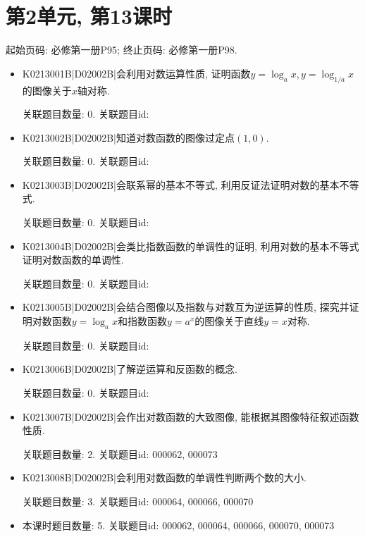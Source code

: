\section*{第2单元, 第13课时}
起始页码: 必修第一册P95; 终止页码: 必修第一册P98.
\begin{itemize}
\item K0213001B|D02002B|会利用对数运算性质, 证明函数$y=\log_ax,y=\log_{1/a}x$的图像关于$x$轴对称.

关联题目数量: 0. 关联题目id: 

\item K0213002B|D02002B|知道对数函数的图像过定点$(1,0)$.

关联题目数量: 0. 关联题目id: 

\item K0213003B|D02002B|会联系幂的基本不等式, 利用反证法证明对数的基本不等式.

关联题目数量: 0. 关联题目id: 

\item K0213004B|D02002B|会类比指数函数的单调性的证明, 利用对数的基本不等式证明对数函数的单调性.

关联题目数量: 0. 关联题目id: 

\item K0213005B|D02002B|会结合图像以及指数与对数互为逆运算的性质, 探究并证明对数函数$y=\log_ax$和指数函数$y=a^{x}$的图像关于直线$y=x$对称.

关联题目数量: 0. 关联题目id: 

\item K0213006B|D02002B|了解逆运算和反函数的概念.

关联题目数量: 0. 关联题目id: 

\item K0213007B|D02002B|会作出对数函数的大致图像, 能根据其图像特征叙述函数性质.

关联题目数量: 2. 关联题目id: 000062, 000073

\item K0213008B|D02002B|会利用对数函数的单调性判断两个数的大小.

关联题目数量: 3. 关联题目id: 000064, 000066, 000070

\item 本课时题目数量: 5. 关联题目id: 000062, 000064, 000066, 000070, 000073

\end{itemize}

